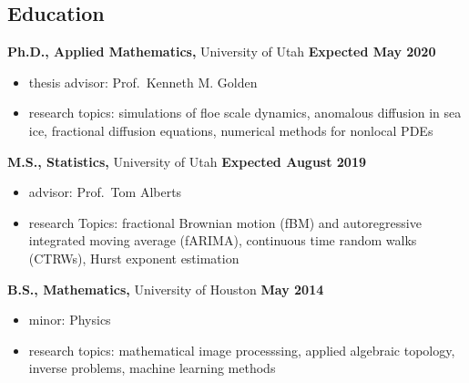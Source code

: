 \documentclass[margin,line]{res}
\begin{document}
\newcommand{\myname}{Huy Dinh}
\newlength{\mynamewidth}
\settowidth{\mynamewidth}{\namefont\myname}

\name{\hspace*{0.5\textwidth}\hspace{-0.5\mynamewidth} \myname \vspace*{.2in}}
\thispagestyle{empty}

\begin{resume}



\section{\sc Education}
{\bf Ph.D., Applied Mathematics,} University of Utah \hfill {\bf Expected May 2020}\\
\vspace*{-.1in}
\begin{itemize} \setlength\itemsep{0em}
\item[ ] thesis advisor: Prof.\ Kenneth M. Golden
\item[ ] research topics: simulations of floe scale dynamics, anomalous diffusion in sea ice, fractional diffusion equations, numerical methods for nonlocal PDEs
\end{itemize}

{\bf M.S., Statistics,} University of Utah \hfill {\bf Expected August 2019}\\
\vspace*{-.1in}
\begin{itemize} \setlength\itemsep{0em}
\item[ ] advisor: Prof.\ Tom Alberts
\item[ ] research Topics: fractional Brownian motion (fBM) and autoregressive integrated moving average (fARIMA), continuous time random walks (CTRWs), Hurst exponent estimation
\end{itemize}

{\bf B.S., Mathematics,} University of Houston \hfill {\bf May 2014}\\
\vspace*{-.1in}
\begin{itemize} \setlength\itemsep{0em}
\item[ ] minor: Physics
\item[ ] research topics: mathematical image processsing, applied algebraic topology, inverse problems, machine learning methods
\end{itemize}


\end{resume}
\end{document}
